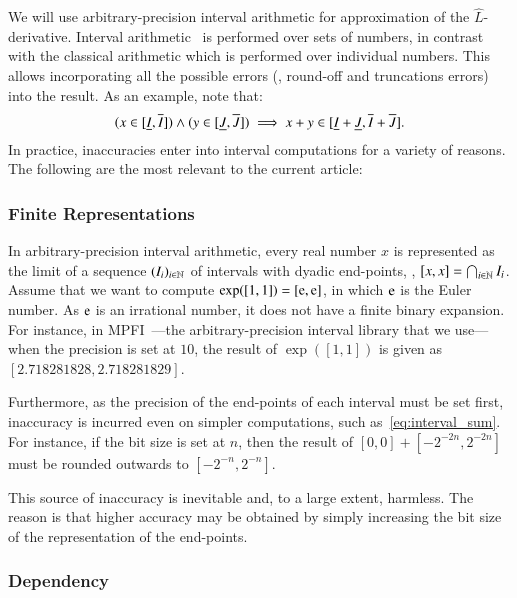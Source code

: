 \documentclass[11pt,times]{article}
\begin{document}
We will use arbitrary-precision interval arithmetic for approximation
of the $\hat{L}$-derivative. Interval
arithmetic~\parencite{Moore:2009:IIA} is performed over sets of numbers,
in contrast with the classical arithmetic which is performed over
individual numbers. This allows incorporating all the possible errors
({\eg}, round-off and truncations errors) into the result. As an
example, note that:
%
  \begin{equation}
    \label{eq:interval_sum}
    (x \in [\lep[I],\uep[I]]) \wedge (y \in [\lep[J],\uep[J]]) \implies  x+y \in [\lep[I]+\lep[J], \uep[I]+\uep[J]].
  \end{equation}
In practice, inaccuracies enter into interval computations for a
variety of reasons. The following are the most relevant to the current article:



\subsubsection{Finite Representations}

In arbitrary-precision interval arithmetic, every real number $x$ is
represented as the limit of a sequence $(I_i)_{i \in \mathbb{N}}$ of intervals
with dyadic end-points, {\ie}, $[x,x] = \bigcap_{i \in \mathbb{N}} I_i$. Assume
that we want to compute $\exp([1,1]) = [\mathrm{e}, \mathrm{e}]$, in which $\mathrm{e}$ is
the Euler number. As $\mathrm{e}$ is an irrational number, it does not have a
finite binary expansion. For instance, in
MPFI~\parencite{Revol_Rouillier:MPFI:05}---the arbitrary-precision
interval library that we use---when the precision is set at $10$, the
result of $\exp([1,1])$ is given as $[2.718281828,2.718281829]$.

Furthermore, as the precision of the end-points of each interval must
be set first, inaccuracy is incurred even on simpler computations,
such as~\eqref{eq:interval_sum}. For instance, if the bit size is set
at $n$, then the result of $[0,0]+[-2^{-2n}, 2^{-2n}]$ must be rounded
outwards to $[-2^{-n}, 2^{-n}]$.

This source of inaccuracy is inevitable and, to a large extent,
harmless. The reason is that higher accuracy may be obtained by simply
increasing the bit size of the representation of the end-points.


\subsubsection{Dependency}
\label{subsubsec:dependency}
\end{document}
